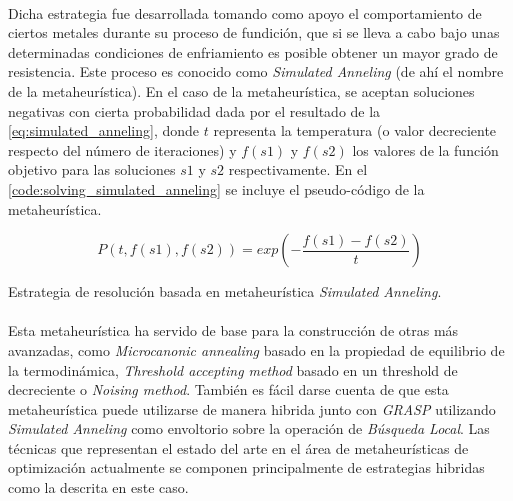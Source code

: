 \documentclass{subfiles}
\begin{document}
        \paragraph{}
        Dicha estrategia fue desarrollada tomando como apoyo el comportamiento de ciertos metales durante su proceso de fundición, que si se lleva a cabo bajo unas determinadas condiciones de enfriamiento es posible obtener un mayor grado de resistencia. Este proceso es conocido como \emph{Simulated Anneling} (de ahí el nombre de la metaheurística). En el caso de la metaheurística, se aceptan soluciones negativas con cierta probabilidad dada por el resultado de la \cref{eq:simulated_anneling}, donde $t$ representa la temperatura (o valor decreciente respecto del número de iteraciones) y $f(s1)$ y $f(s2)$ los valores de la función objetivo para las soluciones $s1$ y $s2$ respectivamente. En el \cref{code:solving_simulated_anneling} se incluye el pseudo-código de la metaheurística.

        \begin{equation}
          \label{eq:simulated_anneling}
          P(t, f(s1), f(s2)) = exp\left(-\frac{f(s1) - f(s2)}{t}\right)
        \end{equation}

        \begin{algorithm}[ht]
          \SetAlgoLined
          \caption{Estrategia de resolución basada en metaheurística \emph{Simulated Anneling}.}
          \label{code:solving_simulated_anneling}
        \end{algorithm}

        \paragraph{}
        Esta metaheurística ha servido de base para la construcción de otras más avanzadas, como \emph{Microcanonic annealing} basado en la propiedad de equilibrio de la termodinámica, \emph{Threshold accepting method} basado en un threshold de decreciente o \emph{Noising method}. También es fácil darse cuenta de que esta metaheurística puede utilizarse de manera hibrida junto con \emph{GRASP} utilizando \emph{Simulated Anneling} como envoltorio sobre la operación de \emph{Búsqueda Local}. Las técnicas que representan el estado del arte en el área de metaheurísticas de optimización actualmente se componen principalmente de estrategias hibridas como la descrita en este caso.
\end{document}
